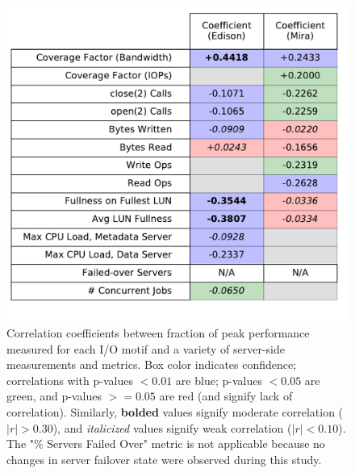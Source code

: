 \begin{figure}[t]
    \centering
    \includegraphics[width=\columnwidth]{figs/correlation_table.pdf}
    \caption{Correlation coefficients between fraction of peak performance measured for each I/O motif and a variety of server-side measurements and metrics.
    Box color indicates confidence; correlations with p-values $< 0.01$ are blue; p-values $< 0.05$ are green, and p-values $>= 0.05$ are red (and signify lack of correlation).
    Similarly, \textbf{bolded} values signify moderate correlation ($|r| > 0.30$), and \textit{italicized} values signify weak correlation ($|r| < 0.10$).
    The "\% Servers Failed Over" metric is not applicable because no
    changes in server failover state were
    observed during this study.
    }
    \label{fig:correlation-table}
\vspace{-.2in}
\end{figure}

